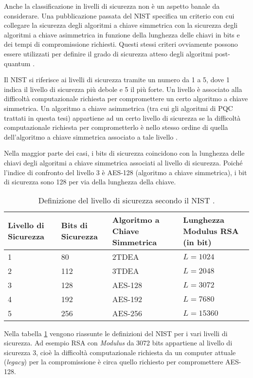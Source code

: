 Anche la classificazione in livelli di sicurezza non è un aspetto banale da considerare. Una pubblicazione passata del NIST specifica un criterio con cui collegare la sicurezza degli algoritmi a chiave simmetrica con la sicurezza degli algoritmi a chiave asimmetrica in funzione della lunghezza delle chiavi in bits e dei tempi di compromissione richiesti. Questi stessi criteri ovviamente possono essere utilizzati per definire il grado di sicurezza atteso degli algoritmi post-quantum  \cite{NISTsecurityLevelsTable}.

Il NIST si riferisce ai livelli di sicurezza tramite un numero da 1 a 5, dove 1 indica il livello di sicurezza più debole e 5 il più forte. Un livello è associato alla difficoltà computazionale richiesta per compromettere un certo algoritmo a chiave simmetrica. 
Un algoritmo a chiave asimmetrica (tra cui gli algoritmi di PQC trattati in questa tesi) appartiene ad un certo livello di sicurezza se la difficoltà computazionale richiesta per comprometterlo è nello stesso ordine di quella dell'algoritmo a chiave simmetrica associato a tale livello \cite{NISTsecurityLevelsTable}.

Nella maggior parte dei casi, i bits di sicurezza coincidono con la lunghezza delle chiavi degli algoritmi a chiave simmetrica associati al livello di sicurezza. Poiché l'indice di confronto del livello 3 è AES-128 (algoritmo a chiave simmetrica), i bit di sicurezza sono 128 per via della lunghezza della chiave.

\begin{table}[H]
\centering
\begin{tabular}{ | m{5em} | m{9em}| m{9em} | m{9em} | }
\hline
\textbf{Livello di Sicurezza} & \textbf{Bits di Sicurezza} & \textbf{Algoritmo a Chiave Simmetrica} & \textbf{Lunghezza Modulus RSA (in bit)}\\ \hline
1 & 80  & 2TDEA  & $L = 1024$ \\ \hline
2 & 112 & 3TDEA & $L = 2048$ \\ \hline
3 & 128 & AES-128 & $L = 3072$ \\ \hline
4 & 192 & AES-192 & $L = 7680$ \\ \hline
5 & 256 & AES-256 & $L = 15360$ \\ \hline
\end{tabular}
\caption{Definizione del livello di sicurezza secondo il NIST \cite{NISTsecurityLevelsTable}.}
\label{tab:SecurityLevels}
\end{table}

Nella tabella \ref{tab:SecurityLevels} vengono riassunte le definizioni del NIST per i vari livelli di sicurezza. Ad esempio RSA con \textit{Modulus} da 3072 bits appartiene al livello di sicurezza 3, cioè la difficoltà computazionale richiesta da un computer attuale (\textit{legacy}) per la compromissione è circa quello richiesto per compromettere AES-128.

